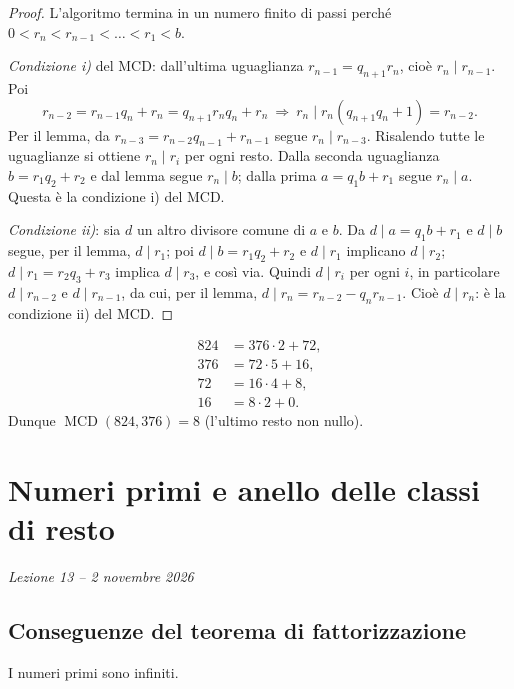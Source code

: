 \documentclass[11pt,a4paper]{article}
\begin{document}
\begin{proof}
L'algoritmo termina in un numero finito di passi perché $0 < r_n < r_{n-1} < \dots < r_1 < b$.

\emph{Condizione i)} del MCD: dall'ultima uguaglianza $r_{n-1} = q_{n+1} r_n$, cioè $r_n \mid r_{n-1}$. Poi
\[
  r_{n-2} = r_{n-1} q_n + r_n = q_{n+1} r_n q_n + r_n \ \Rightarrow\ r_n \mid r_n(q_{n+1} q_n + 1) = r_{n-2}.
\]
Per il lemma, da $r_{n-3} = r_{n-2} q_{n-1} + r_{n-1}$ segue $r_n \mid r_{n-3}$. Risalendo tutte le uguaglianze si ottiene $r_n \mid r_i$ per ogni resto. Dalla seconda uguaglianza $b = r_1 q_2 + r_2$ e dal lemma segue $r_n \mid b$; dalla prima $a = q_1 b + r_1$ segue $r_n \mid a$. Questa è la condizione i) del MCD.

\emph{Condizione ii)}: sia $d$ un altro divisore comune di $a$ e $b$. Da $d \mid a = q_1 b + r_1$ e $d \mid b$ segue, per il lemma, $d \mid r_1$; poi $d \mid b = r_1 q_2 + r_2$ e $d \mid r_1$ implicano $d \mid r_2$; $d \mid r_1 = r_2 q_3 + r_3$ implica $d \mid r_3$, e così via. Quindi $d \mid r_i$ per ogni $i$, in particolare $d \mid r_{n-2}$ e $d \mid r_{n-1}$, da cui, per il lemma, $d \mid r_n = r_{n-2} - q_n r_{n-1}$. Cioè $d \mid r_n$: è la condizione ii) del MCD.
\end{proof}

\begin{esempio}
\begin{align*}
  824 &= 376\cdot 2 + 72,\\
  376 &= 72\cdot 5 + 16,\\
  72 &= 16\cdot 4 + 8,\\
  16 &= 8\cdot 2 + 0 .
\end{align*}
Dunque $\operatorname{MCD}(824, 376) = 8$ (l'ultimo resto non nullo).
\end{esempio}

\section[Numeri primi e anello delle classi di resto (Lezione 13 -- 2 novembre 2026)]{Numeri primi e anello delle classi di resto}
\noindent\emph{Lezione 13 -- 2 novembre 2026}
\subsection{Conseguenze del teorema di fattorizzazione}

\begin{proposizione}
I numeri primi sono infiniti.
\end{proposizione}
\end{document}
